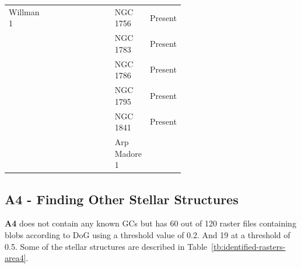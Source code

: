 \begin{table}[H]
\begin{tabular}{lL{0.2\linewidth}lL{0.2\linewidth}lL{0.2\linewidth}}
        Willman 1 &                         &        &                         & NGC 1756     & Present          \\
                  &                         &        &                         & NGC 1783     & Present          \\
                  &                         &        &                         & NGC 1786     & Present          \\
                  &                         &        &                         & NGC 1795     & Present          \\
                  &                         &        &                         & NGC 1841     & Present          \\
                  &                         &        &                         & Arp Madore 1 &                  \\
        \bottomrule
    \end{tabular}
\end{table}








\subsection{A4 - Finding Other Stellar Structures}

\textbf{A4} does not contain any known GCs but has 60 out of 120 raster files containing blobs according to DoG using a threshold value of 0.2. And 19 at a threshold of 0.5. Some of the stellar structures are described in Table~\ref{tb:identified-rasters-area4}.


